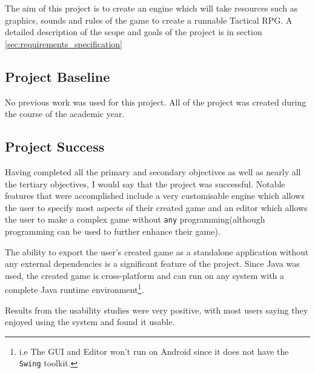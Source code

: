 The aim of this project is to create an engine which will take resources such as graphics, sounds and rules of the game to create a runnable Tactical RPG. A detailed description of the scope and goals of the project is in section \ref{sec:requirements_specification}

\subsection{Project Baseline}
\label{sub:baseline}

No previous work was used for this project. All of the project was created during the course of the academic year.

\subsection{Project Success}

Having completed all the primary and secondary objectives as well as nearly all the tertiary objectives, I would say that the project was successful.  Notable features that were accomplished include a very customisable engine which allows the user to specify most aspects of their created game and an editor which allows the user to make a complex game without \texttt{any} programming(although programming can be used to further enhance their game). 

The ability to export the user's created game as a standalone application without any external dependencies is a significant feature of the project. Since Java was used, the created game is cross-platform and can run on any system with  a complete Java runtime environment\footnote{i.e The GUI and Editor won't run on Android since it does not have the \texttt{Swing} toolkit.}.  

Results from the usability studies were very positive, with most users saying they enjoyed using the system and found it usable. 
